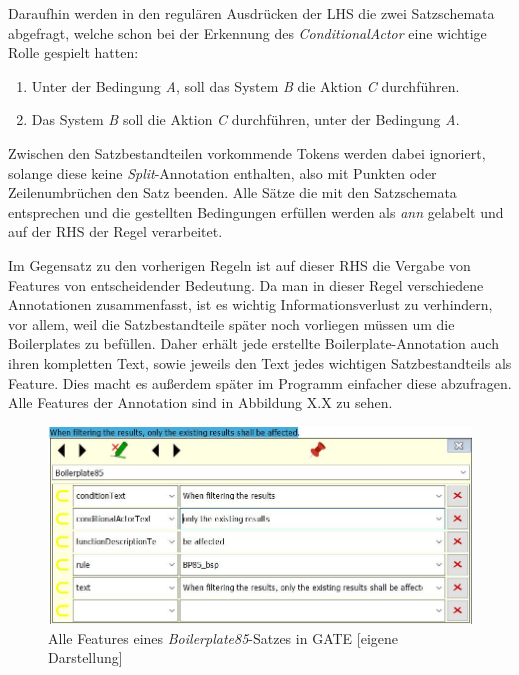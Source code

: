 \documentclass[12pt]{report}
\begin{document}
Daraufhin werden in den regulären Ausdrücken der LHS die zwei Satzschemata abgefragt, welche schon bei der Erkennung des \textit{ConditionalActor} eine wichtige Rolle gespielt hatten:
\begin{enumerate}
\item Unter der Bedingung \textit{A}, soll das System \textit{B} die Aktion \textit{C} durchführen.
\item Das System \textit{B} soll die Aktion \textit{C} durchführen, unter der Bedingung \textit{A}.
\end{enumerate}

Zwischen den Satzbestandteilen vorkommende Tokens werden dabei ignoriert, solange diese keine \textit{Split}-Annotation enthalten, also mit Punkten oder Zeilenumbrüchen den Satz beenden. Alle Sätze die mit den Satzschemata entsprechen und die gestellten Bedingungen erfüllen werden als \textit{ann} gelabelt und auf der RHS der Regel verarbeitet.

Im Gegensatz zu den vorherigen Regeln ist auf dieser RHS die Vergabe von Features von entscheidender Bedeutung. Da man in dieser Regel verschiedene Annotationen zusammenfasst, ist es wichtig Informationsverlust zu verhindern, vor allem, weil die Satzbestandteile später noch vorliegen müssen um die Boilerplates zu befüllen. Daher erhält jede erstellte Boilerplate-Annotation auch ihren kompletten Text, sowie jeweils den Text jedes wichtigen Satzbestandteils als Feature. Dies macht es außerdem später im Programm einfacher diese abzufragen. Alle Features der Annotation sind in Abbildung X.X zu sehen. 

\begin{figure}[H]
\begin{center}
\includegraphics[scale=0.9]{Bilder/BP85Features.jpg}
\caption{Alle Features eines \textit{Boilerplate85}-Satzes in GATE [eigene Darstellung]}
\end{center}
\end{figure}
\end{document}

